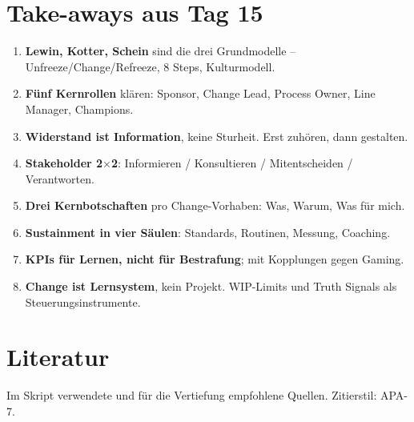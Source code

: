 \documentclass[11pt,a4paper,oneside]{article}
\begin{document}
\section{Take-aways aus Tag 15}

\begin{enumerate}
  \item \textbf{Lewin, Kotter, Schein} sind die drei Grundmodelle -- Unfreeze/Change/Refreeze, 8 Steps, Kulturmodell.
  \item \textbf{Fünf Kernrollen} klären: Sponsor, Change Lead, Process Owner, Line Manager, Champions.
  \item \textbf{Widerstand ist Information}, keine Sturheit. Erst zuhören, dann gestalten.
  \item \textbf{Stakeholder 2$\times$2}: Informieren / Konsultieren / Mitentscheiden / Verantworten.
  \item \textbf{Drei Kernbotschaften} pro Change-Vorhaben: Was, Warum, Was für mich.
  \item \textbf{Sustainment in vier Säulen}: Standards, Routinen, Messung, Coaching.
  \item \textbf{KPIs für Lernen, nicht für Bestrafung}; mit Kopplungen gegen Gaming.
  \item \textbf{Change ist Lernsystem}, kein Projekt. WIP-Limits und Truth Signals als Steuerungsinstrumente.
\end{enumerate}

\clearpage
\section{Literatur}

Im Skript verwendete und für die Vertiefung empfohlene Quellen. Zitierstil: APA-7.
\end{document}
